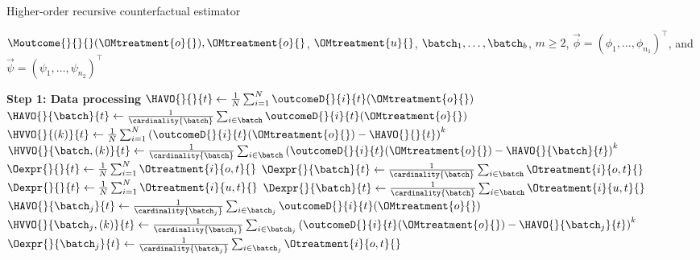 % 
\begin{algorithm}
\caption{Higher-order recursive counterfactual estimator}
\label{alg:HO-recursive}
% 
\small
\begin{algorithmic}
% 
% 
\Require $\Moutcome{}{}{}(\OMtreatment{o}{}), \OMtreatment{o}{}$, $\OMtreatment{u}{}$, $\batch_1, \ldots, \batch_b$, $m \geq 2$, $\Vec\phi = (\phi_1, \ldots, \phi_{n_1})^\top$, and $\Vec\psi = (\psi_1, \ldots, \psi_{n_2})^\top$
% 

\State \hspace{-1.3em} \textbf{Step 1: Data processing}
% 
    \State $\HAVO{}{}{t}
        \gets
        \frac{1}{N} \sum_{i=1}^N \outcomeD{}{i}{t} (\OMtreatment{o}{})$
    \State $\HAVO{}{\batch}{t}
        \gets
        \frac{1}{\cardinality{\batch}} \sum_{i \in \batch} \outcomeD{}{i}{t} (\OMtreatment{o}{})$
        \State $\HVVO{}{(k)}{t}
        \gets
        \frac{1}{N} \sum_{i=1}^N 
        \left(
        \outcomeD{}{i}{t} (\OMtreatment{o}{})
        -
        \HAVO{}{}{t}
        \right)^k$
        \State $\HVVO{}{\batch,(k)}{t}
        \gets
        \frac{1}{\cardinality{\batch}} \sum_{i \in \batch}
        \left(
        \outcomeD{}{i}{t} (\OMtreatment{o}{})
        -
        \HAVO{}{\batch}{t}
        \right)^k$
    \EndFor
    \State $\Oexpr{}{}{t}
        \gets
        \frac{1}{N} \sum_{i=1}^N \Otreatment{i}{o,t}{}$
    \State $\Oexpr{}{\batch}{t}
        \gets
        \frac{1}{\cardinality{\batch}} \sum_{i \in \batch} \Otreatment{i}{o,t}{}$
    \State $\Dexpr{}{}{t}
        \gets
        \frac{1}{N} \sum_{i=1}^N \Otreatment{i}{u,t}{}$
    \State $\Dexpr{}{\batch}{t}
        \gets
        \frac{1}{\cardinality{\batch}} \sum_{i \in \batch} \Otreatment{i}{u,t}{}$
        \State $\HAVO{}{\batch_j}{t}
        \gets
        \frac{1}{\cardinality{\batch_j}} \sum_{i \in  \batch_j} \outcomeD{}{i}{t} (\OMtreatment{o}{})$
            \State $\HVVO{}{\batch_j,(k)}{t}
            \gets
            \frac{1}{\cardinality{\batch_j}} \sum_{i \in  \batch_j} 
            \left(
            \outcomeD{}{i}{t} (\OMtreatment{o}{})
            -
            \HAVO{}{\batch_j}{t}
            \right)^k$
        \EndFor
        \State $\Oexpr{}{\batch_j}{t}
        \gets
        \frac{1}{\cardinality{\batch_j}} \sum_{i \in  \batch_j} \Otreatment{i}{o,t}{}$
    \EndFor    
% 
\EndFor
% 


\end{algorithmic}
\end{algorithm}
